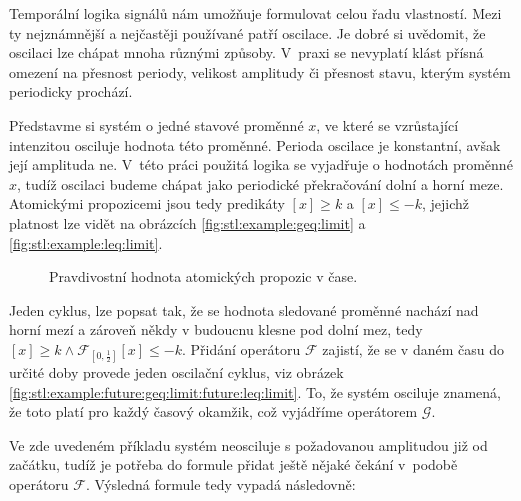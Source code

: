 Temporální logika signálů nám umožňuje formulovat celou řadu vlastností. Mezi ty
nejznámnější a nejčastěji používané patří oscilace. Je dobré si u\-vě\-do\-mit, že oscilaci
lze chápat mnoha různými způsoby. V~praxi se nevyplatí klást přísná omezení na přesnost
periody, velikost amplitudy či přesnost stavu, kterým systém periodicky prochází. 

Představme si systém o jedné stavové proměnné $x$, ve které se vzrů\-sta\-jí\-cí intenzitou
osciluje hodnota této proměnné. Perioda oscilace je konstantní, avšak její amplituda ne. V~této práci
použitá logika se vyjadřuje o hodnotách proměnné $x$, tudíž oscilaci budeme
chápat jako periodické pře\-kra\-čo\-vá\-ní dolní a horní meze. Atomickými propozicemi jsou tedy
predikáty $[x] \geq k$ a $[x] \leq -k$, jejichž platnost lze vidět na obrázcích
\ref{fig:stl:example:geq:limit} a \ref{fig:stl:example:leq:limit}.

\begin{figure}[h!]
\begin{center}
\caption{Pravdivostní hodnota atomických propozic v čase.}
\end{center}
\end{figure}

Jeden cyklus, lze popsat tak, že se hodnota sledované proměnné nachází nad horní mezí a zároveň někdy
v budoucnu klesne pod dolní mez, tedy $[x] \geq k \wedge \mathcal{F}_{[0, \frac{1}{2}]}[x] \leq -k$.
Přidání operátoru $\mathcal{F}$ zajistí, že se v daném času do určité doby provede jeden oscilační cyklus,
viz obrázek \ref{fig:stl:example:future:geq:limit:future:leq:limit}. To, že systém
osciluje znamená, že toto platí pro každý časový okamžik, což vyjádříme operátorem $\mathcal{G}$.

Ve zde uvedeném příkladu systém neosciluje s požadovanou amplitudou již od začátku,
tudíž je potřeba do formule přidat ještě nějaké čekání v~podobě operátoru $\mathcal{F}$.
Výsledná formule tedy vypadá následovně:

